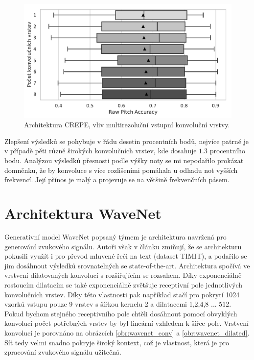 \begin{figure}[h!]\centering
    \includegraphics[scale=0.6]{../img/figures/crepe_multirozliseni_grey}
\caption{Architektura CREPE, vliv multirezoluční vstupní konvoluční vrstvy.}\label{obr:crepe_multirozliseni}
\end{figure}

Zlepšení výsledků se pohybuje v řádu desetin procentních bodů, nejvíce patrné je v případě pěti různě širokých konvolučních vrstev, kde dosahuje $1.3$ procentního bodu. Analýzou výsledků přesnosti podle výšky noty se mi nepodařilo prokázat domněnku, že by konvoluce s více rozlišeními pomáhala u odhadu not vyšších frekvencí. Její přínos je malý a projevuje se na většině frekvenčních pásem.



\section{Architektura WaveNet}\label{sec:wavenet}

Generativní model WaveNet popsaný týmem \cite{Oord2016} je architektura navržená pro generování zvukového signálu. Autoři však v článku zmiňují, že se architekturu pokusili využít i pro převod mluvené řeči na text (dataset TIMIT), a podařilo se jim dosáhnout výsledků srovnatelných se state-of-the-art. Architektura spočívá ve vrstvení dilatovaných konvolucí s rozšiřujícím se rozsahem. Díky exponenciálně rostoucím dilatacím se také exponenciálně zvětšuje receptivní pole jednotlivých konvolučních vrstev. Díky této vlastnosti pak například stačí pro pokrytí 1024 vzorků vstupu pouze 9 vrstev s šířkou kernelu 2 a dilatacemi 1,2,4,8 ... 512. Pokud bychom stejného receptivního pole chtěli dosáhnout pomocí obvyklých konvolucí počet potřebných vrstev by byl lineární vzhledem k šířce pole. Vrstvení konvolucí je porovnáno na obrázcích \ref{obr:wavenet_conv} a \ref{obr:wavenet_dilated}. Síť tedy velmi snadno pokryje široký kontext, což je vlastnost, která je pro zpracování zvukového signálu užitečná.

